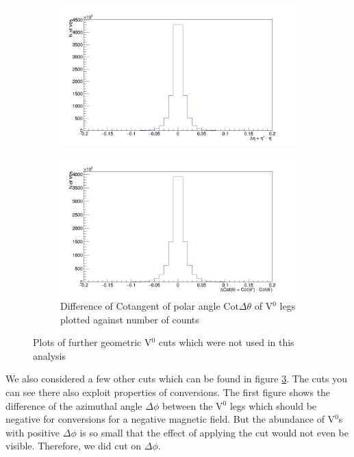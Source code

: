 \begin{figure}
\begin{subfigure}[h]{.4\linewidth}
\includegraphics[width=1.0\linewidth]{Figures/additionalV0cuts/DeltaEta.png}
\caption{}
\label{fig:DEta}
\end{subfigure}\hspace{1cm}%
\begin{subfigure}[h]{.4\linewidth}
\includegraphics[width=1.0\linewidth]{Figures/additionalV0cuts/DeltaCotTheta.png}
\caption{Difference of Cotangent of polar angle $\mathrm{Cot}\Delta\theta$ of V$^0$ legs plotted against number of counts}
\label{fig:DCotTheta}
\end{subfigure}
\vspace{0.5cm}
\caption{Plots of further geometric V$^0$ cuts which were not used in this analysis}
\label{fig:addV0cuts}
\end{figure}
We also considered a few other cuts which can be found in figure \ref{fig:addV0cuts}. The cuts you can see there also exploit properties of conversions. The first figure shows the difference of the azimuthal angle $\Delta\phi$ between the V$^0$ legs which should be negative for conversions for a negative magnetic field. But the abundance of V$^0$s with positive $\Delta\phi$ is so small that the effect of applying the cut would not even be visible. Therefore, we did cut on $\Delta\phi$. \\
